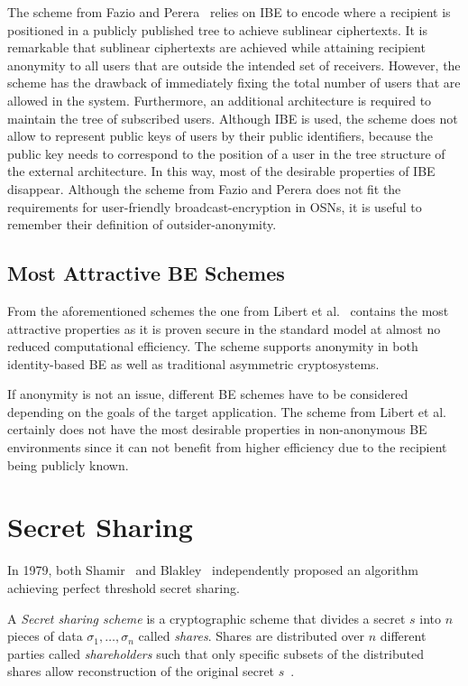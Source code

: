 The scheme from Fazio and Perera~\cite{art:FazioP12} relies on IBE to encode where a recipient is positioned in a publicly published tree to achieve sublinear ciphertexts. It is remarkable that sublinear ciphertexts are achieved while attaining recipient anonymity to all users that are outside the intended set of receivers. However, the scheme has the drawback of immediately fixing the total number of users that are allowed in the system. Furthermore, an additional architecture is required to maintain the tree of subscribed users. Although IBE is used, the scheme does not allow to represent public keys of users by their public identifiers, because the public key needs to correspond to the position of a user in the tree structure of the external architecture. In this way, most of the desirable properties of IBE disappear. Although the scheme from Fazio and Perera does not fit the requirements for user-friendly broadcast-encryption in OSNs, it is useful to remember their definition of outsider-anonymity.

\subsection{Most Attractive BE Schemes}
From the aforementioned schemes the one from Libert et al.~\cite{art:LibertQ03} contains the most attractive properties as it is proven secure in the standard model at almost no reduced computational efficiency. The scheme supports anonymity in both identity-based BE as well as traditional asymmetric cryptosystems.

If anonymity is not an issue, different BE schemes have to be considered depending on the goals of the target application. The scheme from Libert et al.~\cite{art:LibertPQ12} certainly does not have the most desirable properties in non-anonymous BE environments since it can not benefit from higher efficiency due to the recipient being publicly known.

\section{Secret Sharing}
In 1979, both Shamir~\cite{art:Shamir79} and Blakley~\cite{art:Blakley79} independently proposed an algorithm achieving perfect threshold secret sharing.

\begin{defn}
\label{def:secret_sharing_scheme}
 A \textit{Secret sharing scheme} is a cryptographic scheme that divides a secret $s$ into $n$ pieces of data $\sigma_1, \ldots, \sigma_n$ called \textit{shares}. Shares are distributed over $n$ different parties called \textit{shareholders} such that only specific subsets of the distributed shares allow reconstruction of the original secret $s$~\cite{book:handbook_of_applied_cryptography}.
\end{defn}

